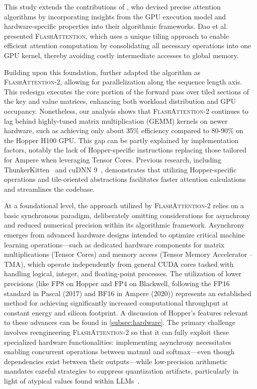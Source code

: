 This study extends the contributions of \citet{dao2022flashattention}, who devised precise attention algorithms by incorporating insights from the GPU execution model and hardware-specific properties into their algorithmic frameworks. Dao et al. presented \textsc{FlashAttention}, which uses a unique tiling approach to enable efficient attention computation by consolidating all necessary operations into one GPU kernel, thereby avoiding costly intermediate accesses to global memory.

Building upon this foundation, \citet{dao2023flashattention2} further adapted the algorithm as \textsc{FlashAttention-2}, allowing for parallelization along the sequence length axis. This redesign executes the core portion of the forward pass over tiled sections of the key and value matrices, enhancing both workload distribution and GPU occupancy. Nonetheless, our analysis shows that \textsc{FlashAttention-2} continues to lag behind highly-tuned matrix multiplication (GEMM) kernels on newer hardware, such as achieving only about 35\% efficiency compared to 80-90\% on the Hopper H100 GPU. This gap can be partly explained by implementation factors, notably the lack of Hopper-specific instructions replacing those tailored for Ampere when leveraging Tensor Cores. Previous research, including ThunkerKitten~\citep{spector2024thunder} and cuDNN 9~\citep{cudnn9}, demonstrates that utilizing Hopper-specific operations and tile-oriented abstractions facilitates faster attention calculations and streamlines the codebase.

At a foundational level, the approach utilized by \textsc{FlashAttention-2} relies on a basic synchronous paradigm, deliberately omitting considerations for asynchrony and reduced numerical precision within its algorithmic framework. Asynchrony emerges from advanced hardware designs intended to optimize critical machine learning operations—such as dedicated hardware components for matrix multiplications (Tensor Cores) and memory access (Tensor Memory Accelerator -- TMA), which operate independently from general CUDA cores tasked with handling logical, integer, and floating-point processes. The utilization of lower precisions (like FP8 on Hopper and FP4 on Blackwell, following the FP16 standard in Pascal (2017) and BF16 in Ampere (2020)) represents an established method for achieving significantly increased computational throughput at constant energy and silicon footprint. A discussion of Hopper’s features relevant to these advances can be found in \cref{subsec:hardware}. The primary challenge involves reengineering \textsc{FlashAttention-2} so that it can fully exploit these specialized hardware functionalities: implementing asynchrony necessitates enabling concurrent operations between matmul and softmax—even though dependencies exist between their outputs—while low-precision arithmetic mandates careful strategies to suppress quantization artifacts, particularly in light of atypical values found within LLMs~\citep{dettmers2208llm, sun2024massive}.

